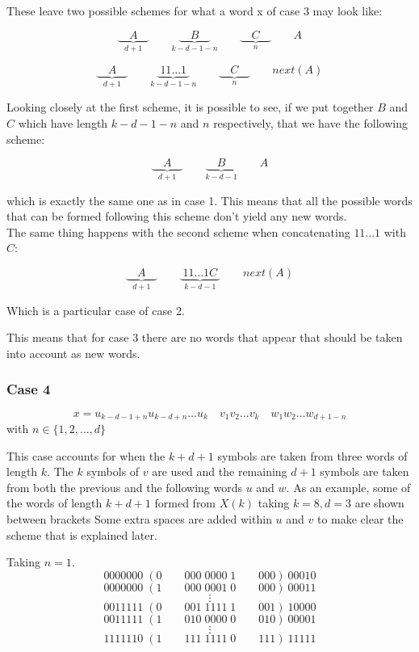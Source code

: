 \documentclass[11pt,a4paper]{tesis}
\theoremstyle{definition}
\begin{document}
These leave two possible schemes for what a word x of case 3 may look like:

$$\underbrace{\quad A \quad }_{d +1} \qquad \underbrace{\quad B \quad }_{k - d - 1 - n}  \qquad \underbrace{\quad C \quad }_{n} \qquad A$$

$$\underbrace{\quad A \quad }_{d +1} \qquad \underbrace{\; 11\dots1 \; }_{k - d - 1 - n}  \qquad \underbrace{\quad C \quad }_{n} \qquad next(A)$$

Looking closely at the first scheme, it is possible to see, if we put together $B$ and $C$ which have length $k - d - 1 - n$ and $n$ respectively, that we have the following scheme:

$$\underbrace{\quad A \quad }_{d +1} \qquad \underbrace{\quad B \quad }_{k - d - 1}  \qquad A$$

which is exactly the same one as in case 1. This means that all the possible words that can be formed following this scheme don't yield any new words.
\\
The same thing happens with the second scheme when concatenating $11\dots1$ with $C$:

$$\underbrace{\quad A \quad }_{d +1} \qquad \underbrace{\; 11\dots1C \; }_{k - d - 1}  \qquad next(A)$$

Which is a particular case of case 2.

This means that for case 3 there are no words that appear that should be taken into account as new words.


\subsubsection{Case 4}
$$ x = u_{k-d-1+n} u_{k-d+n} \dots u_k \quad v_1 v_2 \dots v_k \quad w_1 w_2 \dots w_{d+1-n}$$
with $n \in \{1, 2, \dots , d\}$

This case accounts for when the $k + d + 1$ symbols are taken from three words of length $k$. The $k$ symbols of $v$ are used and the remaining $d + 1$ symbols are taken from both the previous and the following words $u$ and $w$.
As an example, some of the words of length $k + d + 1$ formed from $X(k)$ taking $k = 8, d = 3$ are shown between brackets
Some extra spaces are added within $u$ and $v$ to make clear the scheme that is explained later.

Taking $n = 1$.
$$0000000\; (0 \qquad 000 \; 0000 \; 1 \qquad 000) \: 00010$$
$$0000000\; (1 \qquad 000 \; 0001 \; 0 \qquad 000) \: 00011$$
$$\vdots$$
$$0011111\; (0 \qquad 001 \; 1111 \; 1 \qquad 001) \: 10000$$
$$0011111\; (1 \qquad 010 \; 0000 \; 0 \qquad 010) \: 00001$$
$$\vdots$$
$$1111110\; (1 \qquad 111 \; 1111 \; 0 \qquad 111) \: 11111$$
\end{document}
